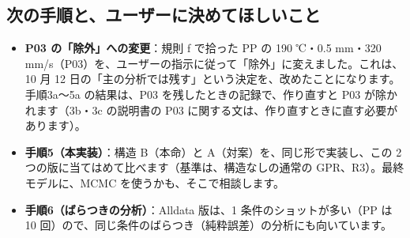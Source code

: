 \documentclass[paper=a4paper,fontsize=10.5pt,line_length=44zw,number_of_lines=38]{jlreq}
\newenvironment{points}{\begin{itemize}[label=$\triangleright$,leftmargin=1.5\zw,itemsep=0.3ex,topsep=0.5ex,parsep=0pt]}{\end{itemize}}
\newcommand{\pt}[1]{\item \textbf{#1}：}
\begin{document}
\subsection{次の手順と、ユーザーに決めてほしいこと}
\begin{points}
\pt{P03 の「除外」への変更}規則 f で拾った PP の 190 ℃・0.5 mm・320 mm/s（P03）を、ユーザーの指示に従って「除外」に変えました。これは、10 月 12 日の「主の分析では残す」という決定を、改めたことになります。手順3a〜5a の結果は、P03 を残したときの記録で、作り直すと P03 が除かれます（3b・3c の説明書の P03 に関する文は、作り直すときに直す必要があります）。
\pt{手順5（本実装）}構造 B（本命）と A（対案）を、同じ形で実装し、この 2 つの版に当てはめて比べます（基準は、構造なしの通常の GPR、R3）。最終モデルに、MCMC を使うかも、そこで相談します。
\pt{手順6（ばらつきの分析）}Alldata 版は、1 条件のショットが多い（PP は 10 回）ので、同じ条件のばらつき（純粋誤差）の分析にも向いています。
\end{points}
\end{document}
